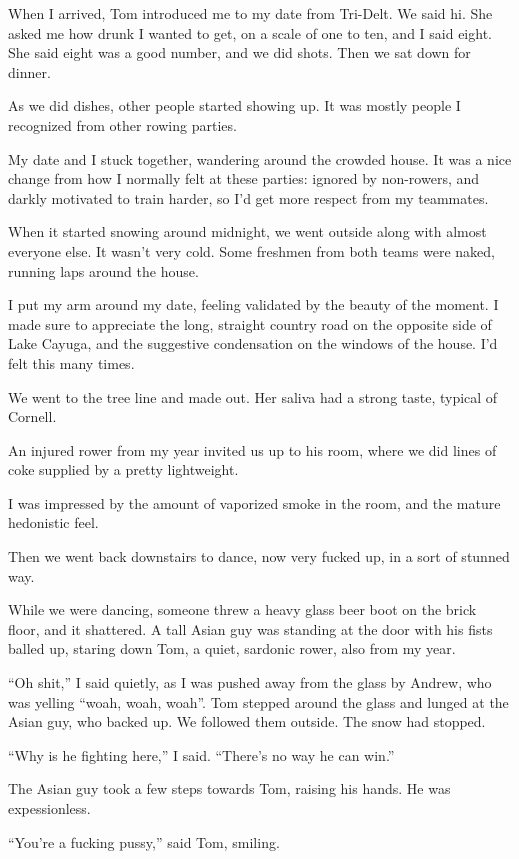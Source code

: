 When I arrived, Tom introduced me to my date from Tri-Delt.  We said hi.  She
asked me how drunk I wanted to get, on a scale of one to ten, and I said eight.
She said eight was a good number, and we did shots.  Then we sat down for
dinner.

As we did dishes, other people started showing up.  It was mostly people I
recognized from other rowing parties.  

My date and I stuck together, wandering around the crowded house. It was a nice
change from how I normally felt at these parties: ignored by non-rowers, and
darkly motivated to train harder, so I'd get more respect from my teammates.

When it started snowing around midnight, we went outside along with almost
everyone else.  It wasn't very cold.  Some freshmen from both teams were naked,
running laps around the house.

I put my arm around my date, feeling validated by the beauty of the moment.   I
made sure to appreciate the long, straight country road on the opposite side of
Lake Cayuga, and the suggestive condensation on the windows of the house.  I'd
felt this many times. 

We went to the tree line and made out.  Her saliva had a strong taste, typical
of Cornell.

An injured rower from my year invited us up to his room, where we did lines of
coke supplied by a pretty lightweight. 

I was impressed by the amount of vaporized smoke in the room, and the mature
hedonistic feel.  

Then we went back downstairs to dance, now very fucked up, in a sort of stunned
way.  

While we were dancing, someone threw a heavy glass beer boot on the brick floor,
and it shattered.  A tall Asian guy was standing at the door with his fists
balled up, staring down Tom, a quiet, sardonic rower, also from my year.  

``Oh shit,'' I said quietly, as I was pushed away from the glass by Andrew, who
was yelling ``woah, woah, woah''.  Tom stepped around the glass and lunged at the
Asian guy, who backed up. We followed them outside.  The snow had stopped.

``Why is he fighting here,'' I said.  ``There's no way he can win.'' 

The Asian guy took a few steps towards Tom, raising his hands.  He was
expessionless.

``You're a fucking pussy,'' said Tom, smiling. 

